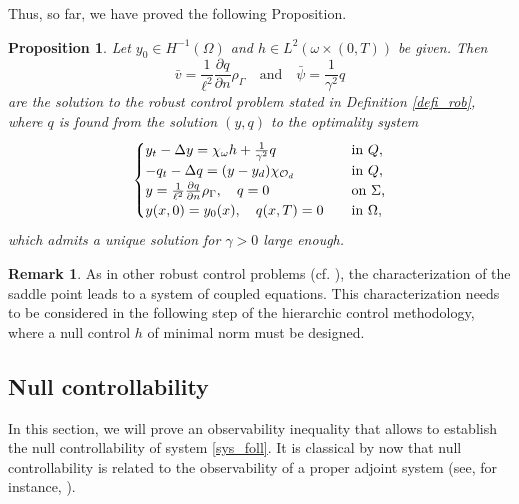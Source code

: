 \documentclass{dcds-bOF}
\newtheorem{proposition}{Proposition}
\theoremstyle{definition}
\newtheorem{remark}{Remark}
\def\csbd{\rho_{\Gamma}}
\begin{document}
Thus, so far, we have proved the following Proposition.
%
\begin{proposition}
Let $y_0\in H^{-1}(\Omega)$ and $h\in L^2(\omega\times(0,T))$ be given. Then
%
\begin{equation*}
\bar v=\frac{1}{\ell^2}\frac{\partial q}{\partial n}\csbd \quad\text{and}\quad \bar \psi=\frac{1}{\gamma^2}q
\end{equation*}
%
are the solution to the robust control problem stated in Definition \ref{defi_rob}, where $q$ is found from the solution $(y,q)$ to the optimality system
%
\begin{equation}\label{sys_foll}
\begin{cases}
y_t-\Delta y= \chi_\omega h+\frac{1}{\gamma^2}q \quad&\textnormal{in }Q, \\
-q_t-\Delta q=(y-y_d)\chi_{\mathcal O_d} \quad& \textnormal{in }Q, \\
y=\frac{1}{\ell^2}\frac{\partial q}{\partial n}\csbd, \quad q=0 \quad &\textnormal{on $\Sigma$,} \\
y(x,0)=y_0(x), \quad q(x,T)=0 \quad &\textnormal{in $\Omega$},
\end{cases}
\end{equation}
%
which admits a unique solution for $\gamma>0$ large enough.
%
\end{proposition}

\begin{remark}
As in other robust control problems (cf. \cite{aziz,temam_nonlinear}), the characterization of the saddle point leads to a system of coupled equations. This characterization needs to be considered in the following step of the hierarchic control methodology, where a null control $h$ of minimal norm must be designed.
\end{remark}

\subsection{Null controllability}\label{sec_null_1}

In this section, we will prove an observability inequality that allows to establish the null controllability of system \eqref{sys_foll}. It is classical by now that null controllability is related to the observability of a proper adjoint system (see, for instance, \cite{cara_guerrero,zab}).
\end{document}
